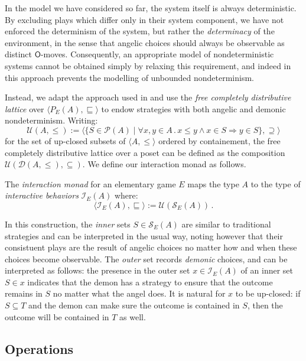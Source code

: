 \documentclass[format=sigplan,authordraft]{acmart}
\newcommand{\kw}[1]{\ensuremath{ \mathsf{#1} }}
\begin{document}
In the model we have considered so far,
the system itself is always deterministic.
By excluding plays which differ only in their system component,
we have not enforced the determinism of the system,
but rather the \emph{determinacy} of the environment,
in the sense that angelic choices should always be observable
as distinct \kw{O}-moves.
Consequently,
an appropriate model of nondeterministic systems
cannot be obtained simply by relaxing this requirement,
and indeed in \cite{gsfnd} this approach
prevents the modelling of unbounded nondeterminism.

Instead,
we adapt the approach used in \cite{augtyp}
and use the \emph{free completely distributive lattice}
over $\langle P_E(A), {\sqsubseteq} \rangle$
to endow strategies with both angelic and demonic nondeterminism.
Writing:
\[
  \mathcal{U}(A, {\le}) :=
    \langle
    \{ S \in \mathcal{P}(A) \mid
        \forall x, y \in A \,.\,
           x \le y \wedge x \in S \Rightarrow y \in S \},
    {\supseteq}
    \rangle
\]
for the set of up-closed subsets of $\langle A, {\le} \rangle$
ordered by containement,
the free completely distributive lattice over a poset
can be defined as the composition
$\mathcal{U}(\mathcal{D}(A, {\le}), {\subseteq})$.
We define our interaction monad as follows.

\begin{definition}
The \emph{interaction monad}
for an elementary game $E$
maps the type $A$ to the type of \emph{interactive behaviors}
$\mathcal{I}_E(A)$ where:
\[
  \langle \mathcal{I}_E(A), {\sqsubseteq} \rangle :=
    \mathcal{U}(\mathcal{S}_E(A)) \,.
\]
\end{definition}

In this construction,
the \emph{inner} sets $S \in \mathcal{S}_E(A)$
are similar to traditional strategies and
can be interpreted in the usual way,
noting however that their consistuent plays
are the result of angelic choices
no matter how and when these choices become observable.
The \emph{outer} set records \emph{demonic} choices,
and can be interpreted as follows:
the presence in the outer set $x \in \mathcal{I}_E(A)$
of an inner set $S \in x$
indicates that the demon has a strategy
to ensure that the outcome remains in $S$
no matter what the angel does.
It is natural for $x$ to be up-closed:
if $S \subseteq T$ and the demon can make sure
the outcome is contained in $S$,
then the outcome will be contained in $T$ as well.

\subsection{Operations}
\end{document}
